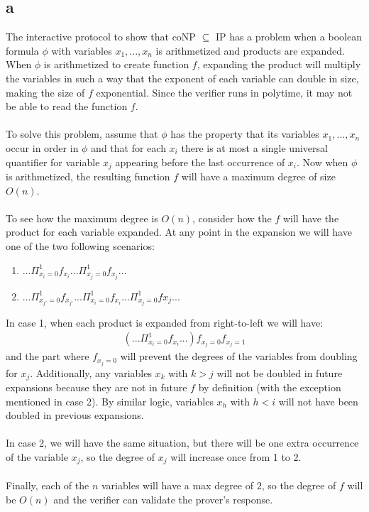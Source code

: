 \documentclass[letterpaper,notitlepage,twoside]{article}
\begin{document}
\subsection*{a}
The interactive protocol to show that coNP $\subseteq$ IP has a problem when a boolean formula $\phi$ with variables $x_1,...,x_n$ is arithmetized and products are expanded. When $\phi$ is arithmetized to create function $f$, expanding the product will multiply the variables in such a way that the exponent of each variable can double in size, making the size of $f$ exponential. Since the verifier runs in polytime, it may not be able to read the function $f$.
\\\\
To solve this problem, assume that $\phi$ has the property that its variables $x_1,...,x_n$ occur in order in $\phi$ and that for each $x_i$ there is at most a single universal quantifier for variable $x_j$ appearing before the last occurrence of $x_i$. Now when $\phi$ is arithmetized, the resulting function $f$ will have a maximum degree of size $O(n)$.
\\\\
To see how the maximum degree is $O(n)$, consider how the $f$ will have the product for each variable expanded. At any point in the expansion we will have one of the two following scenarios:
\begin{enumerate}
\item $...\Pi_{x_i=0}^1f_{x_i}...\Pi_{x_j=0}^1f_{x_j}...$
\item $...\Pi_{x_{j'}=0}^1f_{x_{j'}}...\Pi_{x_i=0}^1f_{x_i}...\Pi_{x_j=0}^1f{x_j}...$
\end{enumerate}
In case 1, when each product is expanded from right-to-left we will have:
\begin{align*}
\left(...\Pi_{x_i=0}^1f_{x_i}...\right)f_{x_j=0}f_{x_j=1}
\end{align*}
and the part where $f_{x_j=0}$ will prevent the degrees of the variables from doubling for $x_j$. Additionally, any variables $x_k$ with $k > j$ will not be doubled in future expansions because they are not in future $f$ by definition (with the exception mentioned in case 2). By similar logic, variables $x_h$ with $h < i$ will not have been doubled in previous expansions.
\\\\
In case 2, we will have the same situation, but there will be one extra occurrence of the variable $x_j$, so the degree of $x_j$ will increase once from 1 to 2.
\\\\
Finally, each of the $n$ variables will have a max degree of $2$, so the degree of $f$ will be $O(n)$ and the verifier can validate the prover's response.
\end{document}
